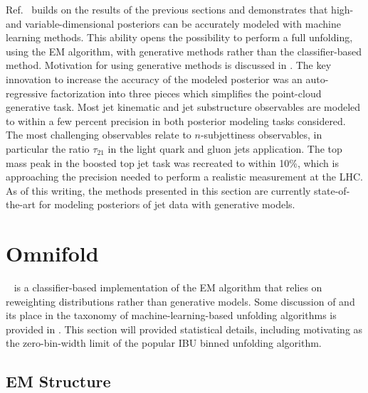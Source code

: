 Ref.~\cite{Petitjean:2025tgk} builds on the results of the previous sections and demonstrates that high- and variable-dimensional posteriors can be accurately modeled with machine learning methods.
This ability opens the possibility to perform a full unfolding, using the EM algorithm, with generative methods rather than the classifier-based \Omnifold method.
Motivation for using generative methods is discussed in .
The key innovation to increase the accuracy of the modeled posterior was an auto-regressive factorization into three pieces which simplifies the point-cloud generative task.
Most jet kinematic and jet substructure observables are modeled to within a few percent precision in both posterior modeling tasks considered.
The most challenging observables relate to $n$-subjettiness observables, in particular the ratio $\tau_{21}$ in the light quark and gluon jets application.
The top mass peak in the boosted top jet task was recreated to within 10\%, which is approaching the precision needed to perform a realistic measurement at the LHC.
As of this writing, the methods presented in this section are currently state-of-the-art for modeling posteriors of jet data with generative models.

\FloatBarrier

\section{Omnifold}
\label{sec:omnifold}

\Omnifold~\cite{Andreassen:2019cjw} is a classifier-based implementation of the EM algorithm that relies on reweighting distributions rather than generative models.
Some discussion of \Omnifold and its place in the taxonomy of machine-learning-based unfolding algorithms is provided in .
This section will provided statistical details, including motivating \Omnifold as the zero-bin-width limit of the popular IBU binned unfolding algorithm.

\subsection{EM Structure}
\label{sec:omnifold-em}


